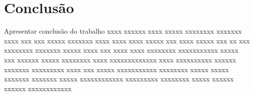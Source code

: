 \chapter{Conclusão}

Apresentar conclusão do trabalho xxxx xxxxxx xxxx xxxxx xxxxxxxx xxxxxxx xxxx
xxx xxx xxxxx xxxxxxx xxxx xxxx xxxx xxxxx xxx xxxx xxxxx xxx xx
xxx xxxxxxxx xxxxxxx xxxxx xxxx xxx xxxx xxxx
xxxxxxxx xxxxxxxxxxx xxxxx xxx xxxxxx xxxxx xxxxxxxx xxxx
xxxxxxxxxxxxx xxxx xxxxxxxxxx xxxxxx xxxxxxx xxxxxxxxx xxxx xxx
xxxxx xxxxxxxxxxx xxxxxxxx xxxxx xxxxx xxxxxxx xxxxxxx xxxxx
xxxxxxxxxxxx xxxxxxxxx xxxxxxxx xxxxx xxxxxx xxxxxx xxxxxxxxxxxx